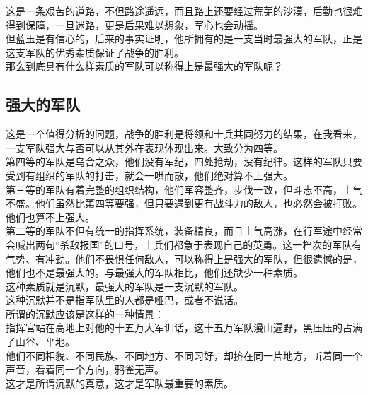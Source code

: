 \begin{multicols}{\theparacolNo}
这是一条艰苦的道路，不但路途遥远，而且路上还要经过荒芜的沙漠，后勤也很难得到保障，一旦迷路，更是后果难以想象，军心也会动摇。\\

但蓝玉是有信心的，后来的事实证明，他所拥有的是一支当时最强大的军队，正是这支军队的优秀素质保证了战争的胜利。\\

那么到底具有什么样素质的军队可以称得上是最强大的军队呢？\\

\subsection{强大的军队}
这是一个值得分析的问题，战争的胜利是将领和士兵共同努力的结果，在我看来，一支军队强大与否可以从其外在表现体现出来。大致分为四等。\\

第四等的军队是乌合之众，他们没有军纪，四处抢劫，没有纪律。这样的军队只要受到有组织的军队的打击，就会一哄而散，他们绝对算不上强大。\\

第三等的军队有着完整的组织结构，他们军容整齐，步伐一致，但斗志不高，士气不盛。他们虽然比第四等要强，但只要遇到更有战斗力的敌人，也必然会被打败。他们也算不上强大。\\

第二等的军队不但有统一的指挥系统，装备精良，而且士气高涨，在行军途中经常会喊出两句“杀敌报国”的口号，士兵们都急于表现自己的英勇。这一档次的军队有气势、有冲劲。他们不畏惧任何敌人，可以称得上是强大的军队，但很遗憾的是，他们也不是最强大的。与最强大的军队相比，他们还缺少一种素质。\\

这种素质就是沉默，最强大的军队是一支沉默的军队。\\

这种沉默并不是指军队里的人都是哑巴，或者不说话。\\

所谓的沉默应该是这样的一种情景：\\

指挥官站在高地上对他的十五万大军训话，这十五万军队漫山遍野，黑压压的占满了山谷、平地。\\

他们不同相貌、不同民族、不同地方、不同习好，却挤在同一片地方，听着同一个声音，看着同一个方向，鸦雀无声。\\

这才是所谓沉默的真意，这才是军队最重要的素质。\\


\end{multicols}
